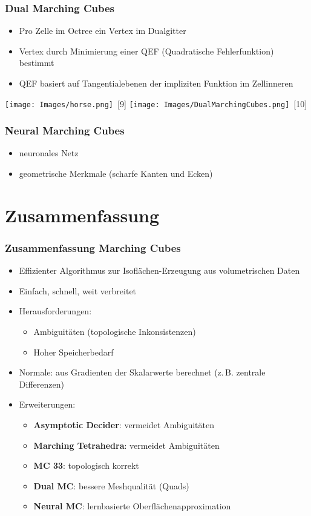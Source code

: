 \documentclass{beamer}
\begin{document}
\begin{frame}[t]
  \frametitle{Dual Marching Cubes}
  \begin{itemize}
    \item Pro Zelle im Octree ein Vertex im Dualgitter
    \item Vertex durch Minimierung einer QEF (Quadratische Fehlerfunktion) bestimmt
    \item QEF basiert auf Tangentialebenen der impliziten Funktion im Zellinneren
\end{itemize}
\texttt{[image: Images/horse.png]}~\scriptsize[9]
\hspace{1cm}
\texttt{[image: Images/DualMarchingCubes.png]}~\scriptsize[10]
\end{frame}

\begin{frame}[t]
  \frametitle{Neural Marching Cubes}
  \noindent
  \begin{itemize}
    \item neuronales Netz
    \item geometrische Merkmale (scharfe Kanten und Ecken)
  \end{itemize}
\end{frame}

\section{Zusammenfassung}
\begin{frame}[t]
  \frametitle{Zusammenfassung Marching Cubes}
  \begin{itemize}
    \item Effizienter Algorithmus zur Isoflächen-Erzeugung aus volumetrischen Daten
    \item Einfach, schnell, weit verbreitet %
    \item Herausforderungen:
    \begin{itemize}
      \item Ambiguitäten (topologische Inkonsistenzen)
      \item Hoher Speicherbedarf
    \end{itemize}
    \item Normale: aus Gradienten der Skalarwerte berechnet (z.\,B. zentrale Differenzen)
    \item Erweiterungen:
    \begin{itemize}
      \item \textbf{Asymptotic Decider}: vermeidet Ambiguitäten
      \item \textbf{Marching Tetrahedra}: vermeidet Ambiguitäten
      \item \textbf{MC 33}: topologisch korrekt
      \item \textbf{Dual MC}: bessere Meshqualität (Quads)
      \item \textbf{Neural MC}: lernbasierte Oberflächenapproximation
    \end{itemize}
  \end{itemize}
\end{frame}
\end{document}
